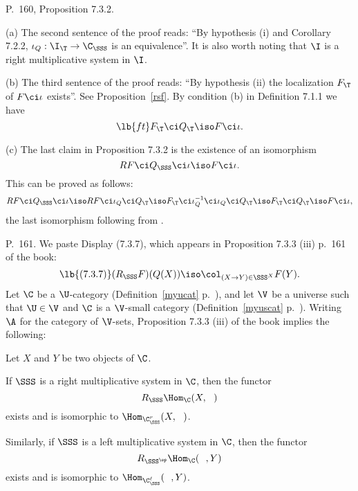 \documentclass[12pt]{article}
\theoremstyle{remark}
\theoremstyle{definition}
\begin{document}

\begin{s} 
P.~160, Proposition 7.3.2. 

\nn(a) The second sentence of the proof reads: ``By hypothesis (i) and Corollary 7.2.2, $\iota_Q:\I_\T\to\C_\SSS$ is an equivalence''. It is also worth noting that $\I$ is a right multiplicative system in $\I$.

\nn(b) The third sentence of the proof reads: ``By hypothesis (ii) the localization $F_\T$ of $F\ci\iota$ exists''. %
See Proposition~\ref{rsf}. By condition (b) in Definition 7.1.1 we have
\begin{equation}\lb{ft}
F_\T\ci Q_\T\iso F\ci\iota.
\end{equation}

\nn(c) The last claim in Proposition 7.3.2 is the existence of an isomorphism 
$$
RF\ci Q_\SSS\ci\iota\iso F\ci\iota.
$$ 
This can be proved as follows: 
$$
RF\ci Q_\SSS\ci\iota\iso RF\ci\iota_Q\ci Q_\T\iso F_\T\ci\iota_Q^{-1}\ci\iota_Q\ci Q_\T\iso F_\T\ci Q_\T\iso F\ci\iota,
$$ 
the last isomorphism following from .


\end{s}

%

\begin{s}
P.~161. We paste Display (7.3.7), which appears in Proposition 7.3.3 (iii) p.~161 of the book:
%
\begin{equation}\lb{(7.3.7)}
(R_\SSS F)(Q(X))\iso\col_{(X\to Y)\in\SSS^X}F(Y).
\end{equation}
%
Let $\C$ be a $\U$-category (Definition~\ref{myucat} p.~), and let $\V$ be a universe such that $\U\in\V$ and $\C$ is a $\V$-small category (Definition~\ref{myuscat} p.~). Writing $\A$ for the category of $\V$-sets, Proposition 7.3.3 (iii) of the book implies the following:

Let $X$ and $Y$ be two objects of $\C$. 

If $\SSS$ is a right multiplicative system in $\C$, then the functor 
$$
R_\SSS\Hom_\C(X,\ \ )
$$ 
exists and is isomorphic to $\Hom_{\C_\SSS^r}(X,\ \ )$. 

Similarly, if $\SSS$ is a left multiplicative system in $\C$, then the functor 
$$
R_{\SSS^{\op}}\Hom_\C(\ \ ,Y)
$$ 
exists and is isomorphic to $\Hom_{\C_\SSS^\ell}(\ \ ,Y)$.
% 
\end{s}
\end{document}
